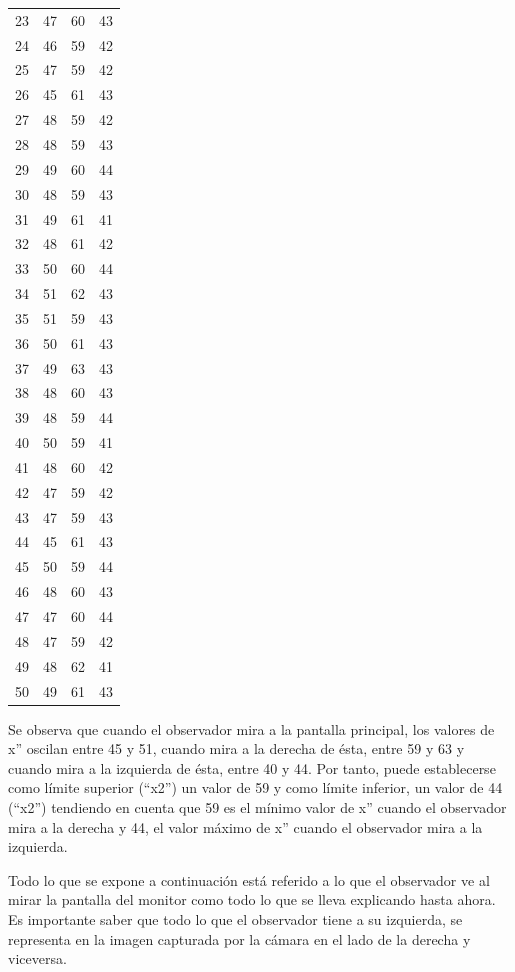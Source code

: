 \begin{longtable}{c|c|c|c}
     23 & 47 & 60 & 43 \\
     24 & 46 & 59 & 42 \\
     25 & 47 & 59 & 42 \\
     26 & 45 & 61 & 43 \\
     27 & 48 & 59 & 42 \\
     28 & 48 & 59 & 43 \\
     29 & 49 & 60 & 44 \\
     30 & 48 & 59 & 43 \\ 
     31 & 49 & 61 & 41 \\ 
     32 & 48 & 61 & 42 \\ 
     33 & 50 & 60 & 44 \\ 
     34 & 51 & 62 & 43 \\ 
     35 & 51 & 59 & 43 \\ 
     36 & 50 & 61 & 43 \\ 
     37 & 49 & 63 & 43 \\ 
     38 & 48 & 60 & 43 \\ 
     39 & 48 & 59 & 44 \\ 
     40 & 50 & 59 & 41 \\ 
     41 & 48 & 60 & 42 \\ 
     42 & 47 & 59 & 42 \\ 
     43 & 47 & 59 & 43 \\ 
     44 & 45 & 61 & 43 \\ 
     45 & 50 & 59 & 44 \\ 
     46 & 48 & 60 & 43 \\ 
     47 & 47 & 60 & 44 \\ 
     48 & 47 & 59 & 42 \\ 
     49 & 48 & 62 & 41 \\ 
     50 & 49 & 61 & 43 \\ \hline
\end{longtable}

Se observa que cuando el observador mira a la pantalla principal, los valores de x'' oscilan entre 45 y 51, cuando mira a la derecha de ésta, entre 59 y 63 y cuando mira a la izquierda de ésta, entre 40 y 44. Por tanto, puede establecerse como límite superior (``x2'') un valor de 59 y como límite inferior, un valor de 44 (``x2'') tendiendo en cuenta que 59 es el mínimo valor de x'' cuando el observador mira a la derecha y 44, el valor máximo de x'' cuando el observador mira a la izquierda.

Todo lo que se expone a continuación está referido a lo que el observador ve al mirar la pantalla del monitor como todo lo que se lleva explicando hasta ahora. Es importante saber que todo lo que el observador tiene a su izquierda, se representa en la imagen capturada por la cámara en el lado de la derecha y viceversa. 

